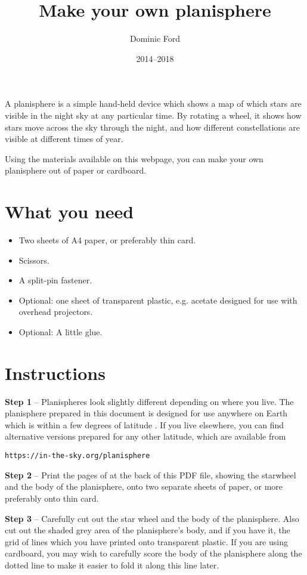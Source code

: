 \documentclass[a4paper,onecolumn,10pt]{article}
\title{Make your own planisphere}
\author{Dominic Ford}
\date{2014--2018}
\begin{document}
\maketitle
\setcounter{footnote}{1}

A planisphere is a simple hand-held device which shows a map of which stars are
visible in the night sky at any particular time. By rotating a wheel, it shows
how stars move across the sky through the night, and how different
constellations are visible at different times of year.

Using the materials available on this webpage, you can make your own
planisphere out of paper or cardboard.

\section*{What you need}

\begin{itemize}
\item Two sheets of A4 paper, or preferably thin card.
\item Scissors.
\item A split-pin fastener.
\item Optional: one sheet of transparent plastic, e.g. acetate designed for use with overhead projectors.
\item Optional: A little glue.
\end{itemize}

\section*{Instructions}

{\bf Step 1} -- Planispheres look slightly different depending on where you
live. The planisphere prepared in this document is designed for use anywhere on
Earth which is within a few degrees of latitude . If you live
elsewhere, you can find alternative versions prepared for any other latitude,
which are available from

\centerline{\tt https://in-the-sky.org/planisphere}

{\bf Step 2} -- Print the pages of at the back of this PDF file, showing the
starwheel and the body of the planisphere, onto two separate sheets of paper,
or more preferably onto thin card.

{\bf Step 3} -- Carefully cut out the star wheel and the body of the
planisphere. Also cut out the shaded grey area of the planisphere's body, and
if you have it, the grid of lines which you have printed onto transparent
plastic. If you are using cardboard, you may wish to carefully score the body
of the planisphere along the dotted line to make it easier to fold it along
this line later.
\end{document}
